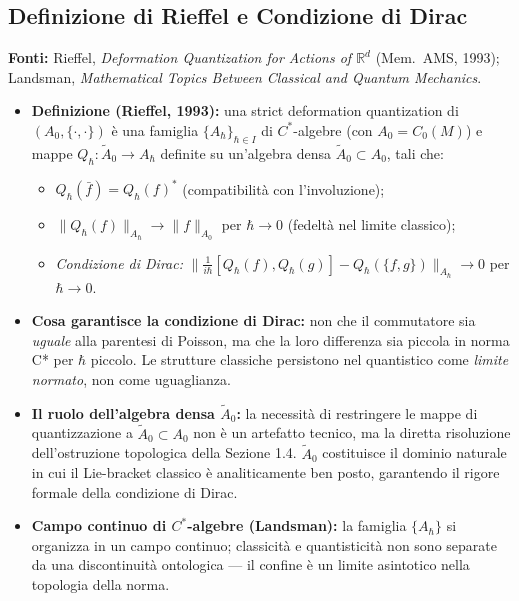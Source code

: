 \documentclass[12pt, a4paper]{article}
\newcommand{\fonti}[1]{%
	\begin{fontebox}
		\textcolor{fontecolor}{\footnotesize\textbf{Fonti:} #1}
	\end{fontebox}%
}
\begin{document}
	\subsection{Definizione di Rieffel e Condizione di Dirac}
	
	\fonti{Rieffel, \textit{Deformation Quantization for Actions of $\mathbb{R}^d$}
		(Mem.\ AMS, 1993); Landsman, \textit{Mathematical Topics Between Classical and
			Quantum Mechanics}.}
	
	\begin{itemize}
		\item \textbf{Definizione (Rieffel, 1993):} una strict deformation quantization
		di $(A_0, \{\cdot,\cdot\})$ è una famiglia $\{A_\hbar\}_{\hbar \in I}$ di
		$C^*$-algebre (con $A_0 = C_0(M)$) e mappe $Q_\hbar: \widetilde{A}_0 \to A_\hbar$
		definite su un'algebra densa $\widetilde{A}_0 \subset A_0$, tali che:
		\begin{itemize}
			\item[(i)] $Q_\hbar(\bar{f}) = Q_\hbar(f)^*$ (compatibilità con l'involuzione);
			\item[(ii)] $\|Q_\hbar(f)\|_{A_\hbar} \to \|f\|_{A_0}$ per $\hbar \to 0$
			(fedeltà nel limite classico);
			\item[(iii)] \emph{Condizione di Dirac:}
			$\bigl\|\tfrac{1}{i\hbar}[Q_\hbar(f), Q_\hbar(g)] - Q_\hbar(\{f,g\})\bigr\|_{A_\hbar}
			\to 0$ per $\hbar \to 0$.
		\end{itemize}
		\item \textbf{Cosa garantisce la condizione di Dirac:} non che il commutatore sia
		\emph{uguale} alla parentesi di Poisson, ma che la loro differenza sia piccola in
		norma C* per $\hbar$ piccolo. Le strutture classiche persistono nel quantistico come
		\emph{limite normato}, non come uguaglianza.
		
		\item \textbf{Il ruolo dell'algebra densa $\widetilde{A}_0$:} la necessità di restringere 
		le mappe di quantizzazione a $\widetilde{A}_0 \subset A_0$ non è un artefatto tecnico, ma la 
		diretta risoluzione dell'ostruzione topologica della Sezione 1.4. $\widetilde{A}_0$ costituisce 
		il dominio naturale in cui il Lie-bracket classico è analiticamente ben posto, garantendo 
		il rigore formale della condizione di Dirac.
		
		\item \textbf{Campo continuo di $C^*$-algebre (Landsman):} la famiglia $\{A_\hbar\}$
		si organizza in un campo continuo; classicità e quantisticità non sono separate da
		una discontinuità ontologica --- il confine è un limite asintotico nella topologia
		della norma.
	\end{itemize}
	
\end{document}
